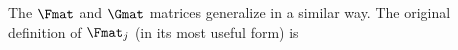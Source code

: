The $\Fmat$ and $\Gmat$ matrices generalize in a similar way.  The original definition of $\Fmat_j$ (in its most useful form) is